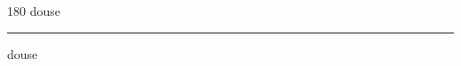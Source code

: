 
\begin{frame}
\begin{center}
\begin{turn}{180}
{\fontsize{2.5cm}{1em}\selectfont douse}
\end{turn}
\vspace{1em}\par  
\hrule
\vspace{1em}\par  
{\fontsize{2.5cm}{1em}\selectfont douse}
\end{center}
\end{frame}
